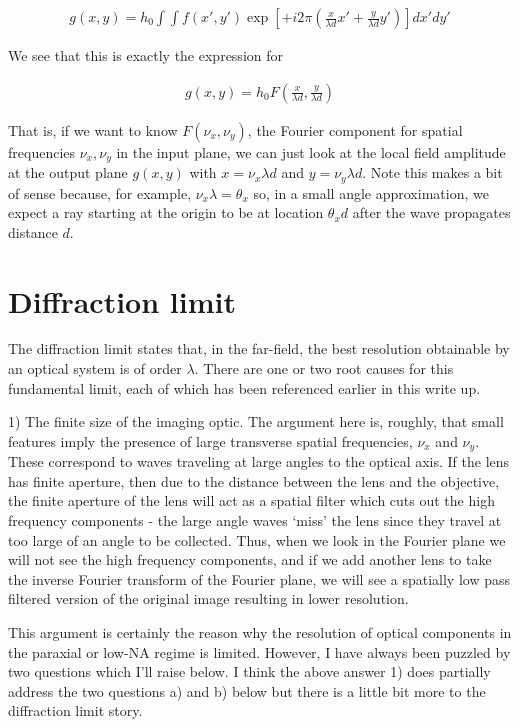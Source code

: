\documentclass[12pt]{article}
\begin{document}
\begin{align}
g(x,y) = h_0\int \int f(x', y') \exp\left[ +i2\pi\left(\frac{x}{\lambda d}x' + \frac{y}{\lambda d} y'\right)\right] dx' dy'
\end{align}

We see that this is exactly the expression for

\begin{align}
g(x,y) =h_0 F\left(\frac{x}{\lambda d}, \frac{y}{\lambda d}\right)
\end{align}

That is, if we want to know $F(\nu_x,\nu_y)$, the Fourier component for spatial frequencies $\nu_x, \nu_y$ in the input plane, we can just look at the local field amplitude at the output plane $g(x,y)$ with $x = \nu_x \lambda d$ and $y = \nu_y \lambda d$. Note this makes a bit of sense because, for example, $\nu_x \lambda = \theta_x$ so, in a small angle approximation, we expect a ray starting at the origin to be at location $\theta_x d$ after the wave propagates distance $d$.


\section{Diffraction limit}

The diffraction limit states that, in the far-field, the best resolution obtainable by an optical system is of order $\lambda$. There are one or two root causes for this fundamental limit, each of which has been referenced earlier in this write up. 

1) The finite size of the imaging optic. The argument here is, roughly, that small features imply the presence of large transverse spatial frequencies, $\nu_x$ and $\nu_y$. 
These correspond to waves traveling at large angles to the optical axis. 
If the lens has finite aperture, then due to the distance between the lens and the objective, the finite aperture of the lens will act as a spatial filter which cuts out the high frequency components - the large angle waves `miss' the lens since they travel at too large of an angle to be collected. Thus, when we look in the Fourier plane we will not see the high frequency components, and if we add another lens to take the inverse Fourier transform of the Fourier plane, we will see a spatially low pass filtered version of the original image resulting in lower resolution.

This argument is certainly the reason why the resolution of optical components in the paraxial or low-NA regime is limited. However, I have always been puzzled by two questions which I'll raise below. I think the above answer 1) does partially address the two questions a) and b) below but there is a little bit more to the diffraction limit story. 
\end{document}
